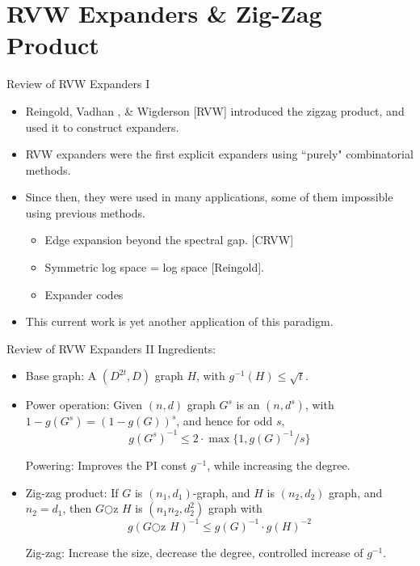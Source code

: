 \documentclass[compress]{beamer}
\newcommand{\oz}{{\bigcirc\!\!\!\!\mathrm{z}\,\,}}
\begin{document}
\section{RVW Expanders \& Zig-Zag Product}

\begin{frame}{Review of RVW Expanders  I}

\begin{itemize}[<+->]
\item Reingold, Vadhan , \& Wigderson [RVW] introduced the zigzag product, and used it to construct expanders.
\item RVW expanders were the first explicit expanders  using ``purely" combinatorial methods.
\item Since then, they were used in many applications, some of them impossible using previous methods.
\begin{itemize}
\item Edge expansion beyond the spectral gap. [CRVW]
\item Symmetric log space = log space [Reingold].
\item Expander codes 
\end{itemize}
\item This current work is yet another application of this paradigm.
\end{itemize}
\end{frame}

\begin{frame}{Review of RVW Expanders II}
Ingredients:
\begin{itemize}[<+->]
\item  \alert{Base graph}: A $(D^{2t},D)$ graph $H$, with  $g^{-1}(H) \le \sqrt{t}$.
\item  \alert{Power operation}: Given $(n,d)$ graph $G^s$ is an $(n,d^s)$, with 
$ 1- g(G^s)= (1- g(G))^s$, and hence for odd $s$,
\[ g(G^s)^{-1}  %
\le 2 \cdot \max\{1,g(G)^{-1}/s\} \]

Powering: {\color{blue}Improves the PI const $g^{-1}$}, while {\color{red} increasing the degree}.

\item \alert{Zig-zag product}: 
If $G$ is $(n_1,d_1)$-graph, and $H$ is $(n_2,d_2)$ graph, and $n_2=d_1$, then
$G \oz H$ is $(n_1 n_2, d_2^2)$ graph with 
\[ g(G\oz H)^{-1}\le g(G)^{-1} \cdot g(H)^{-2} \]

{Zig-zag: \color{blue} Increase the size, decrease the degree, \color{red}controlled increase of $g^{-1}$}.

\end{itemize}
\end{frame}
\end{document}
